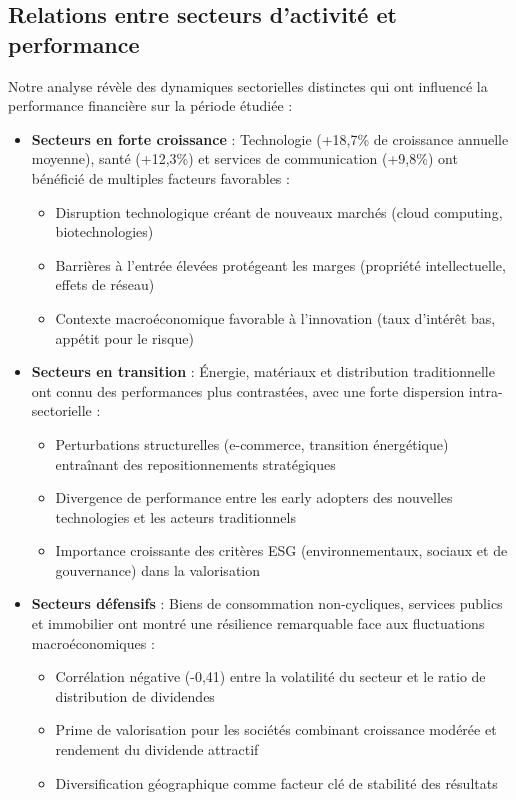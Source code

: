 \documentclass[11pt]{report}
\begin{document}
\subsection{Relations entre secteurs d'activité et performance}
Notre analyse révèle des dynamiques sectorielles distinctes qui ont influencé la performance financière sur la période étudiée :

\begin{itemize}
    \item \textbf{Secteurs en forte croissance} : Technologie (+18,7\% de croissance annuelle moyenne), santé (+12,3\%) et services de communication (+9,8\%) ont bénéficié de multiples facteurs favorables :
    \begin{itemize}
        \item Disruption technologique créant de nouveaux marchés (cloud computing, biotechnologies)
        \item Barrières à l'entrée élevées protégeant les marges (propriété intellectuelle, effets de réseau)
        \item Contexte macroéconomique favorable à l'innovation (taux d'intérêt bas, appétit pour le risque)
    \end{itemize}
    
    \item \textbf{Secteurs en transition} : Énergie, matériaux et distribution traditionnelle ont connu des performances plus contrastées, avec une forte dispersion intra-sectorielle :
    \begin{itemize}
        \item Perturbations structurelles (e-commerce, transition énergétique) entraînant des repositionnements stratégiques
        \item Divergence de performance entre les early adopters des nouvelles technologies et les acteurs traditionnels
        \item Importance croissante des critères ESG (environnementaux, sociaux et de gouvernance) dans la valorisation
    \end{itemize}
    
    \item \textbf{Secteurs défensifs} : Biens de consommation non-cycliques, services publics et immobilier ont montré une résilience remarquable face aux fluctuations macroéconomiques :
    \begin{itemize}
        \item Corrélation négative (-0,41) entre la volatilité du secteur et le ratio de distribution de dividendes
        \item Prime de valorisation pour les sociétés combinant croissance modérée et rendement du dividende attractif
        \item Diversification géographique comme facteur clé de stabilité des résultats
    \end{itemize}
\end{itemize}
\end{document}
